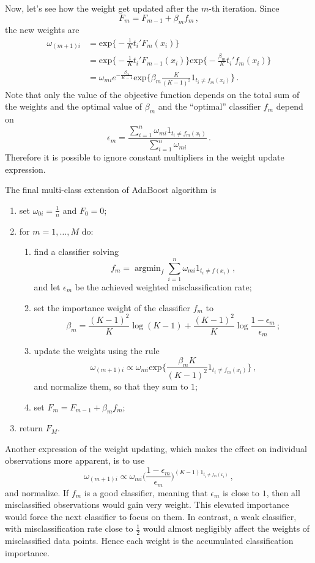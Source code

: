 \documentclass[a4paper]{article}
\newcommand{\argmin}{\mathop{\text{argmin}}}
\begin{document}
Now, let's see how the weight get updated after the $m$-th iteration. Since
\[ F_m = F_{m-1} + \beta_m f_m \,, \]
the new weights are
\begin{align*}
	\omega_{(m+1)i}
	&= \text{exp}\bigl\{ -\frac{1}{K} t_i'F_m(x_i) \bigr\} \\
	&= \text{exp}\bigl\{ -\frac{1}{K} t_i'F_{m-1}(x_i) \bigr\} \text{exp}\biggl\{ -\frac{\beta_m}{K} t_i'f_m(x_i) \biggr\}\\
	&= \omega_{mi} e^{-\frac{\beta_m}{K-1}} \text{exp}\biggl\{ \beta_m \frac{K}{(K-1)^2} 1_{t_i \neq f_m(x_i)} \biggr\} \,.
\end{align*}
Note that only the value of the objective function depends on the total sum of
the weights and the optimal value of $\beta_m$ and the ``optimal'' classifier $f_m$
depend on 
\[ \epsilon_m = \frac{\sum_{i=1}^n \omega_{mi} 1_{t_i \neq f_m(x_i)} }{\sum_{i=1}^n\omega_{mi}} \,. \]
Therefore it is possible to ignore constant multipliers in the weight update expression.

The final multi-class extension of AdaBoost algorithm is \begin{enumerate}
	\item set $\omega_{0i} = \frac{1}{n}$ and $F_0 = 0$;
	\item for $m=1,\ldots, M$ do: \begin{enumerate}
		\item find a classifier solving
		\[ f_m = \argmin_f \sum_{i=1}^n \omega_{mi}  1_{t_i \neq f(x_i)} \,, \]
		and let $\epsilon_m$ be the achieved weighted misclassification rate;
		\item set the importance weight of the classifier $f_m$ to
		\[
		\beta_m =
			\frac{(K-1)^2}{K} \log (K-1) + \frac{(K-1)^2}{K} \log \frac{1-\epsilon_m}{\epsilon_m}
		\,; \]
		\item update the weights using the rule
		\[
		\omega_{(m+1)i} \propto
			\omega_{mi} \text{exp}\bigl\{ \frac{ \beta_m K}{(K-1)^2} 1_{t_i \neq f_m(x_i)} \bigr\}
		\,, \]
		and normalize them, so that they sum to $1$;
		\item set $F_m = F_{m-1} + \beta_m f_m$;
	\end{enumerate}
	\item return $F_M$.
\end{enumerate}
Another expression of the weight updating, which makes the effect on individual observations
more apparent, is to use
\[ \omega_{(m+1)i} \propto
	\omega_{mi} \biggl( \frac{1-\epsilon_m}{\epsilon_m} \biggr)^{ (K-1) 1_{t_i \neq f_m(x_i)} }
\,, \]
and normalize. If $f_m$ is a good classifier, meaning that $\epsilon_m$ is close
to $1$, then all misclassified observations would gain very weight. This elevated
importance would force the next classifier to focus on them. In contrast, a weak
classifier, with misclassification rate close to $\frac{1}{2}$ would almost negligibly
affect the weights of misclassified data points. Hence each weight is the accumulated
classification importance.
\end{document}
